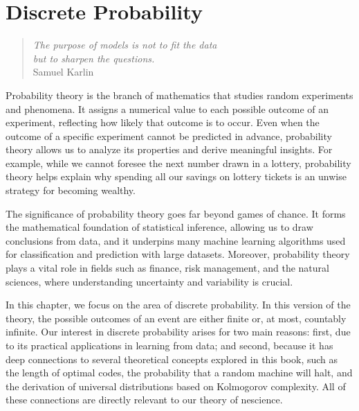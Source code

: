 %
%


\chapter{Discrete Probability}
\label{chap:Probability Theory}

\begin{quote}
\begin{flushright}
\emph{The purpose of models is not to fit the data\\
but to sharpen the questions.}\\
Samuel Karlin
\end{flushright}
\end{quote}
\bigskip

Probability theory is the branch of mathematics that studies random experiments and phenomena. It assigns a numerical value to each possible outcome of an experiment, reflecting how likely that outcome is to occur. Even when the outcome of a specific experiment cannot be predicted in advance, probability theory allows us to analyze its properties and derive meaningful insights. For example, while we cannot foresee the next number drawn in a lottery, probability theory helps explain why spending all our savings on lottery tickets is an unwise strategy for becoming wealthy.

The significance of probability theory goes far beyond games of chance. It forms the mathematical foundation of statistical inference, allowing us to draw conclusions from data, and it underpins many machine learning algorithms used for classification and prediction with large datasets. Moreover, probability theory plays a vital role in fields such as finance, risk management, and the natural sciences, where understanding uncertainty and variability is crucial.

In this chapter, we focus on the area of discrete probability. In this version of the theory, the possible outcomes of an event are either finite or, at most, countably infinite. Our interest in discrete probability arises for two main reasons: first, due to its practical applications in learning from data; and second, because it has deep connections to several theoretical concepts explored in this book, such as the length of optimal codes, the probability that a random machine will halt, and the derivation of universal distributions based on Kolmogorov complexity. All of these connections are directly relevant to our theory of nescience.


